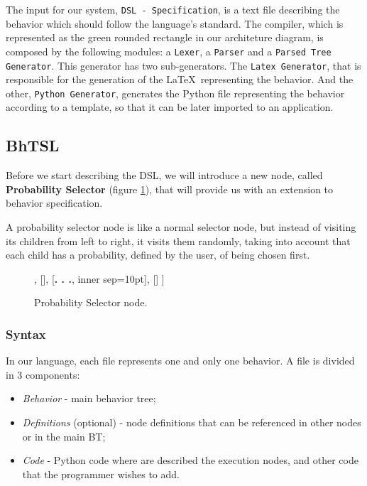 \documentclass[a4paper,UKenglish,cleveref, autoref, thm-restate]{oasics-v2019}
\begin{document}
The input for our system, \texttt{DSL - Specification}, is a text file describing the behavior which should follow the language's standard.
The compiler, which is represented as the green rounded rectangle in our architeture diagram, is composed by the following modules: a \texttt{Lexer}, a \texttt{Parser} and a \texttt{Parsed Tree Generator}.
This generator has two sub-generators.
The \texttt{Latex Generator}, that is responsible for the generation of the \LaTeX\ representing the behavior.
And the other, \texttt{Python Generator}, generates the Python file representing the behavior according to a template, so that it can be later imported to an application.

\subsection{BhTSL}

Before we start describing the DSL, we will introduce a new node, called \textbf{Probability Selector} (figure \ref{fig:prob_selector}), that will provide us with an extension to behavior specification.

A probability selector node is like a normal selector node, but instead of visiting its children from left to right, it visits them randomly, taking into account that each child has a probability, defined by the user, of being chosen first.

\begin{figure}[H]
    \centering
    \begin{behavior}
        [\probselector
            [\probnodeaction{$P_1$}{Child 1}],
            [],
            [{\textbf{. . .}}, inner sep=10pt],
            []
        ]
    \end{behavior}
    \caption{Probability Selector node.}
    \label{fig:prob_selector}
\end{figure}


\subsubsection{Syntax}
In our language, each file represents one and only one behavior.
A file is divided in 3 components:
\begin{itemize}
    \item \textit{Behavior} - main behavior tree;
    \item \textit{Definitions} (optional) - node definitions that can be referenced in other nodes or in the main BT;
    \item \textit{Code} - Python code where are described the execution nodes, and other code that the programmer wishes to add.
\end{itemize}
\end{document}
